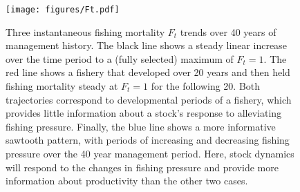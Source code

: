 \documentclass[]{scrartcl}
\begin{document}
\newpage

\begin{figure}[htbp]
\centering
\texttt{[image: figures/Ft.pdf]}
\caption{Three instantaneous fishing mortality $F_t$ trends over 40 years of management history. The black line shows a steady linear increase over the time period to a (fully selected) maximum of $F_t = 1$. The red line shows a fishery that developed over 20 years and then held fishing mortality steady at $F_t = 1$ for the following 20. Both trajectories correspond to developmental periods of a fishery, which provides little information about a stock's response to alleviating fishing pressure. Finally, the blue line shows a more informative sawtooth pattern, with periods of increasing and decreasing fishing pressure over the 40 year management period. Here, stock dynamics will respond to the changes in fishing pressure and provide more information about productivity than the other two cases.}\label{fig:HBMCh1}
\end{figure}

\newpage
\end{document}
